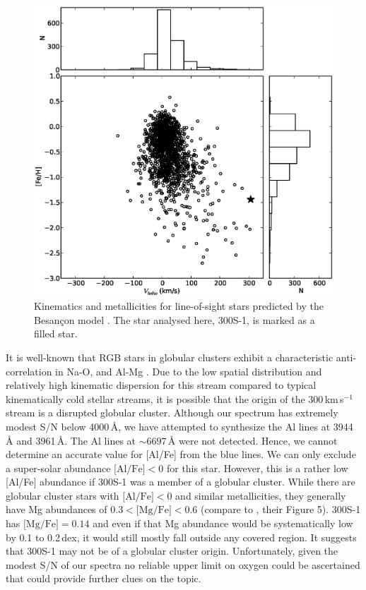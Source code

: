 \documentclass{emulateapj}
\begin{document}
\begin{figure}
 \includegraphics[width=\columnwidth]{besancon.eps}
 \caption{Kinematics and metallicities for line-of-sight stars
   predicted by the Besan\c{c}on model \citep{Robin2003}. The star
   analysed here, 300S-1, is marked as a filled star.}
 \label{fig:besancon}
\end{figure}


It is well-known that RGB stars in globular clusters exhibit a
characteristic anti-correlation in Na-O, and Al-Mg
\citep{Carretta2009}. Due to the low spatial distribution and
relatively high kinematic dispersion for this stream compared to
typical kinematically cold stellar streams, it is possible that the
origin of the 300\,km\,s$^{-1}$ stream is a disrupted globular
cluster. Although our spectrum has extremely modest S/N below
4000\,{\AA}, we have attempted to synthesize the Al lines at
3944\,{\AA} and 3961\,{\AA}. The Al lines at $\sim6697$\,{\AA} were
not detected. Hence, we cannot determine an accurate value
for [Al/Fe] from the blue lines. We can only exclude a super-solar
abundance $\mbox{[Al/Fe]}<0$ for this star. However, this is a rather
low [Al/Fe] abundance if 300S-1 was a member of a globular
cluster. While there are globular cluster stars with
$\mbox{[Al/Fe]}<0$ and similar metallicities, they generally have Mg
abundances of $0.3 < \mbox{[Mg/Fe]} <0.6$ (compare to
\citealt{Carretta2009}, their Figure 5). 300S-1 has $\mbox{[Mg/Fe]} =0.14$
and even if that Mg abundance would be systematically low by 0.1 to
0.2\,dex, it would still mostly fall outside any covered
region. It suggests that 300S-1 may not be of a globular cluster
origin.  Unfortunately, given the modest S/N of our spectra no
reliable upper limit on oxygen could be ascertained that could provide
further clues on the topic.
\end{document}
